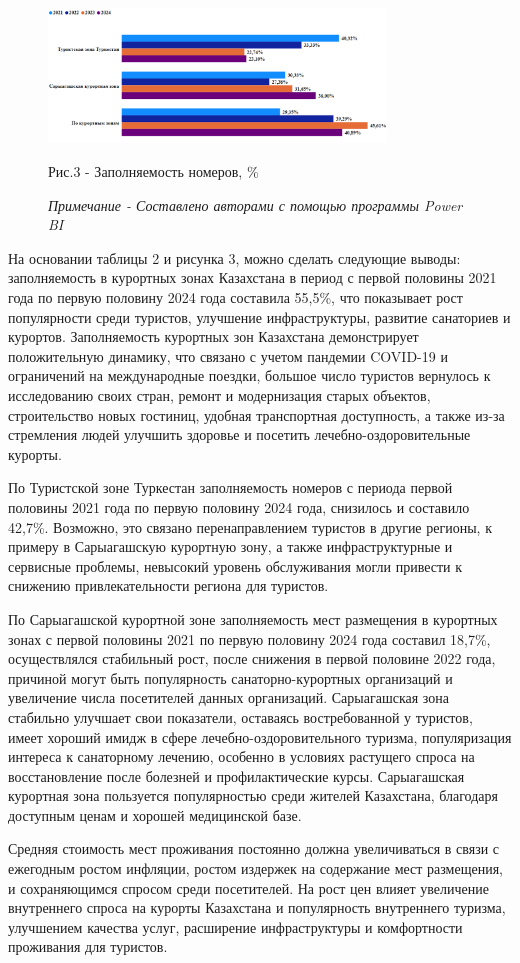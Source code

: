 \begin{figure}[H]
	\centering
	\includegraphics[width=0.8\textwidth]{media/ekon/image5}
	\caption*{Рис.3 - Заполняемость номеров, \%}
	\caption*{\normalfont\emph{Примечание - Составлено авторами с помощью программы Power BI}}
\end{figure}

\begin{multicols}{2}
На основании таблицы 2 и рисунка 3, можно сделать следующие выводы:
заполняемость в курортных зонах Казахстана в период с первой половины
2021 года по первую половину 2024 года составила 55,5\%, что показывает
рост популярности среди туристов, улучшение инфраструктуры, развитие
санаториев и курортов. Заполняемость курортных зон Казахстана
демонстрирует положительную динамику, что связано с учетом пандемии
COVID-19 и ограничений на международные поездки, большое число туристов
вернулось к исследованию своих стран, ремонт и модернизация старых
объектов, строительство новых гостиниц, удобная транспортная
доступность, а также из-за стремления людей улучшить здоровье и посетить
лечебно-оздоровительные курорты.

По Туристской зоне Туркестан заполняемость номеров с периода первой
половины 2021 года по первую половину 2024 года, снизилось и составило
42,7\%. Возможно, это связано перенаправлением туристов в другие
регионы, к примеру в Сарыагашскую курортную зону, а также
инфраструктурные и сервисные проблемы, невысокий уровень обслуживания
могли привести к снижению привлекательности региона для туристов.

По Сарыагашской курортной зоне заполняемость мест размещения в курортных
зонах с первой половины 2021 по первую половину 2024 года составил
18,7\%, осуществлялся стабильный рост, после снижения в первой половине
2022 года, причиной могут быть популярность санаторно-курортных
организаций и увеличение числа посетителей данных организаций.
Сарыагашская зона стабильно улучшает свои показатели, оставаясь
востребованной у туристов, имеет хороший имидж в сфере
лечебно-оздоровительного туризма, популяризация интереса к санаторному
лечению, особенно в условиях растущего спроса на восстановление после
болезней и профилактические курсы. Сарыагашская курортная зона
пользуется популярностью среди жителей Казахстана, благодаря доступным
ценам и хорошей медицинской базе.

Средняя стоимость мест проживания постоянно должна увеличиваться в связи
с ежегодным ростом инфляции, ростом издержек на содержание мест
размещения, и сохраняющимся спросом среди посетителей. На рост цен
влияет увеличение внутреннего спроса на курорты Казахстана и
популярность внутреннего туризма, улучшением качества услуг, расширение
инфраструктуры и комфортности проживания для туристов.
\end{multicols}

